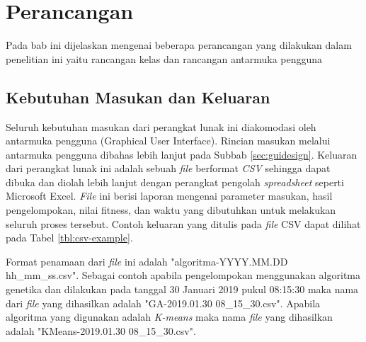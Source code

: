 \chapter{Perancangan}
\label{chap:perancangan}

Pada bab ini dijelaskan mengenai beberapa perancangan yang dilakukan dalam penelitian ini yaitu rancangan kelas dan rancangan antarmuka pengguna

\section{Kebutuhan Masukan dan Keluaran}
Seluruh kebutuhan masukan dari perangkat lunak ini diakomodasi oleh antarmuka pengguna (Graphical User Interface). Rincian masukan melalui antarmuka pengguna dibahas lebih lanjut pada Subbab \ref{sec:guidesign}. Keluaran dari perangkat lunak ini adalah sebuah \textit{file} berformat \textit{CSV} sehingga dapat dibuka dan diolah lebih lanjut dengan perangkat pengolah \textit{spreadsheet} seperti Microsoft Excel. \textit{File} ini berisi laporan mengenai parameter masukan, hasil pengelompokan, nilai fitness, dan waktu yang dibutuhkan untuk melakukan seluruh proses tersebut. Contoh keluaran yang ditulis pada \textit{file} CSV dapat dilihat pada Tabel \ref{tbl:csv-example}. 

Format penamaan dari \textit{file} ini adalah "algoritma-YYYY.MM.DD hh{\_}mm{\_}ss.csv". Sebagai contoh apabila pengelompokan menggunakan algoritma genetika dan dilakukan pada tanggal 30 Januari 2019 pukul 08:15:30 maka nama dari \textit{file} yang dihasilkan adalah "GA-2019.01.30 08{\_}15{\_}30.csv". Apabila algoritma yang digunakan adalah \textit{K-means} maka nama \textit{file} yang dihasilkan adalah "KMeans-2019.01.30 08{\_}15{\_}30.csv".

